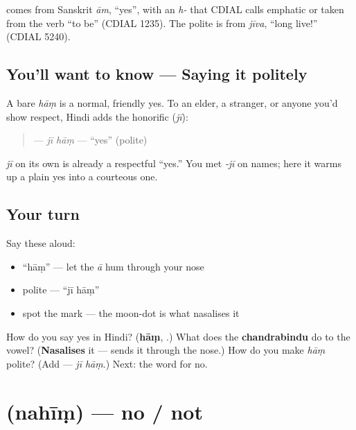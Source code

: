 \begin{cousinweb}
\textbf{} comes from Sanskrit \emph{ām}, \textquotedblleft{}yes\textquotedblright{}, with an \emph{h-} that CDIAL calls emphatic or taken from the verb \textquotedblleft{}to be\textquotedblright{} (CDIAL 1235). The polite \textbf{} is from \emph{jīva}, \textquotedblleft{}long live!\textquotedblright{} (CDIAL 5240).
\end{cousinweb}

\subsection*{You'll want to know — Saying it politely}
A bare \emph{hāṃ} is a normal, friendly yes. To an elder, a stranger, or anyone you'd show respect, Hindi adds the honorific \textbf{} (\emph{jī}):

\begin{quote}
\textbf{ } — \emph{jī hāṃ} — \textquotedblleft{}yes\textquotedblright{} (polite)
\end{quote}

\emph{jī} on its own is already a respectful \textquotedblleft{}yes.\textquotedblright{} You met \emph{‑jī} on names; here it warms up a plain yes into a courteous one.

\subsection*{Your turn}
Say these aloud:

\begin{itemize}
\raggedright
  \item \textquotedblleft{}hāṃ\textquotedblright{} — let the \emph{ā} hum through your nose
  \item polite — \textquotedblleft{}jī hāṃ\textquotedblright{}
  \item spot the mark — the moon-dot \textbf{} is what nasalises it
\end{itemize}

\begin{tcolorbox}[breakable,colback=teal!4,colframe=teal!35!black,title={Before you move on}]
How do you say yes in Hindi? (\textbf{hāṃ}, .) What does the \textbf{chandrabindu}  do to the vowel? (\textbf{Nasalises} it — sends it through the nose.) How do you make \emph{hāṃ} polite? (Add \textbf{} — \emph{jī hāṃ}.) Next: the word for no.
\end{tcolorbox}
\section[\texorpdfstring{\hi{नहीं} / \hi{जानता} (nahīṃ / jāntā)}{नहीं / जानता (nahīṃ / jāntā)}]{ (nahīṃ) — no / not}

